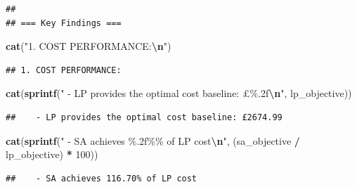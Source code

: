 \documentclass[
]{article}
\newenvironment{Shaded}{\begin{snugshade}}{\end{snugshade}}
\newcommand{\DecValTok}[1]{\textcolor[rgb]{0.00,0.00,0.81}{#1}}
\newcommand{\FunctionTok}[1]{\textcolor[rgb]{0.13,0.29,0.53}{\textbf{#1}}}
\newcommand{\NormalTok}[1]{#1}
\newcommand{\SpecialCharTok}[1]{\textcolor[rgb]{0.81,0.36,0.00}{\textbf{#1}}}
\newcommand{\StringTok}[1]{\textcolor[rgb]{0.31,0.60,0.02}{#1}}
\begin{document}
\begin{verbatim}
## 
## === Key Findings ===
\end{verbatim}

\begin{Shaded}
\begin{Highlighting}[]
\FunctionTok{cat}\NormalTok{(}\StringTok{"1. COST PERFORMANCE:}\SpecialCharTok{\textbackslash{}n}\StringTok{"}\NormalTok{)}
\end{Highlighting}
\end{Shaded}

\begin{verbatim}
## 1. COST PERFORMANCE:
\end{verbatim}

\begin{Shaded}
\begin{Highlighting}[]
\FunctionTok{cat}\NormalTok{(}\FunctionTok{sprintf}\NormalTok{(}\StringTok{"   {-} LP provides the optimal cost baseline: £\%.2f}\SpecialCharTok{\textbackslash{}n}\StringTok{"}\NormalTok{, lp\_objective))}
\end{Highlighting}
\end{Shaded}

\begin{verbatim}
##    - LP provides the optimal cost baseline: £2674.99
\end{verbatim}

\begin{Shaded}
\begin{Highlighting}[]
\FunctionTok{cat}\NormalTok{(}\FunctionTok{sprintf}\NormalTok{(}\StringTok{"   {-} SA achieves \%.2f\%\% of LP cost}\SpecialCharTok{\textbackslash{}n}\StringTok{"}\NormalTok{, (sa\_objective }\SpecialCharTok{/}\NormalTok{ lp\_objective) }\SpecialCharTok{*} \DecValTok{100}\NormalTok{))}
\end{Highlighting}
\end{Shaded}

\begin{verbatim}
##    - SA achieves 116.70% of LP cost
\end{verbatim}

\begin{Shaded}
\end{Shaded}
\end{document}
